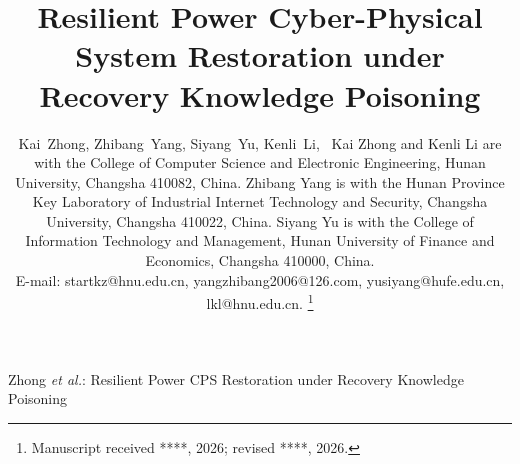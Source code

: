 \title{Resilient Power Cyber-Physical System Restoration under Recovery Knowledge Poisoning\\
}
\author{
        Kai~Zhong,
        Zhibang~Yang,
        Siyang~Yu,
        Kenli~Li,~
\IEEEcompsocitemizethanks
{
\IEEEcompsocthanksitem Kai Zhong and Kenli Li are with the College of Computer Science and Electronic Engineering, Hunan University, Changsha 410082, China.
\IEEEcompsocthanksitem Zhibang Yang is with the Hunan Province Key Laboratory of Industrial Internet Technology and Security, Changsha University, Changsha 410022, China.
\IEEEcompsocthanksitem Siyang Yu is with the College of Information Technology and Management, Hunan University of Finance and Economics, Changsha 410000, China.
\protect\\ E-mail: startkz@hnu.edu.cn, yangzhibang2006@126.com, yusiyang@hufe.edu.cn, lkl@hnu.edu.cn.
}%
\thanks{Manuscript received ****, 2026; revised ****, 2026.}
}

%
{Zhong \MakeLowercase{\textit{et al.}}: Resilient Power CPS Restoration under Recovery Knowledge Poisoning}

